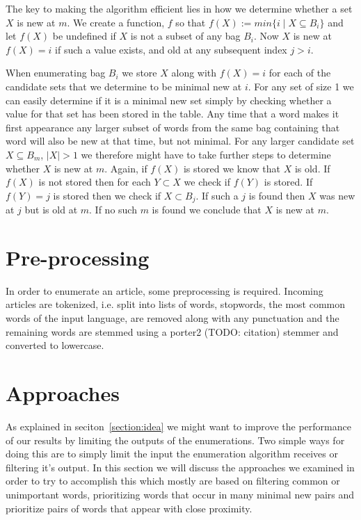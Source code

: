 The key to making the algorithm efficient lies in how we determine whether a set $X$ is new at $m$. We create a function, $f$ so that $f(X) := min\{i \mid X \subseteq B_{i}\}$ and let $f(X)$ be undefined if $X$ is not a subset of any bag $B_{i}$. Now $X$ is new at $f(X)=i$ if such a value exists, and old at any subsequent index $j>i$. 

When enumerating bag $B_{i}$ we store $X$ along with $f(X)=i$ for each of the candidate sets that we determine to be minimal new at $i$. For any set of size 1 we can easily determine if it is a minimal new set simply by checking whether a value for that set has been stored in the table.  Any time that a word makes it first appearance any larger subset of words from the same bag containing that word will also be new at that time, but not minimal. For any larger candidate set $X \subseteq B_{m}$, $|X|>1$ we therefore might have to take further steps to determine whether $X$ is new at $m$. Again, if $f(X)$ is stored we know that $X$ is old. If $f(X)$ is not stored then for each $Y \subset X$ we check if $f(Y)$ is stored. If $f(Y)=j$ is stored then we check if $X \subset B_{j}$. If such a $j$ is found then $X$ was new at $j$ but is old at $m$. If no such $m$ is found we conclude that $X$ is new at $m$.


\section{Pre-processing}
\label{method:preprocessing}
In order to enumerate an article, some preprocessing is required. Incoming articles are tokenized, i.e. split into lists of words, stopwords, the most common words of the input language, are removed along with any punctuation and the remaining words are stemmed using a porter2 (TODO: citation) stemmer and converted to lowercase.

\section{Approaches}
As explained in seciton~\ref{section:idea} we might want to improve the performance of our results by limiting the outputs of the enumerations. Two simple ways for doing this are to simply limit the input the enumeration algorithm receives or filtering it's output.
In this section we will discuss the approaches we examined in order to try to accomplish this which mostly are based on filtering common or unimportant words, prioritizing words that occur in many minimal new pairs and prioritize pairs of words that appear with close proximity.

